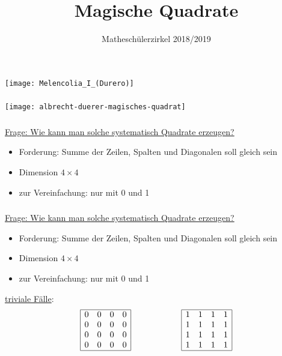 \documentclass[11pt]{beamer}
\begin{document}
	\author{Matheschülerzirkel 2018/2019}
	\title{Magische Quadrate}
\begin{frame}[plain]
	\begin{center}
		\texttt{[image: Melencolia\_I\_(Durero)]}
	\end{center}
\end{frame}

\begin{frame}
	\frametitle{}
	\begin{center}
		\texttt{[image: albrecht-duerer-magisches-quadrat]}
	\end{center}
\end{frame}

\begin{frame}
	\frametitle{}
		\underline{Frage: Wie kann man solche systematisch Quadrate erzeugen?}
	\begin{itemize}
		\item Forderung: Summe der Zeilen, Spalten und Diagonalen soll gleich sein
		\item Dimension $4\times4$
		\item zur Vereinfachung: nur mit 0 und 1 
	\end{itemize}
\end{frame}

\begin{frame}
\frametitle{}
\underline{Frage: Wie kann man solche systematisch Quadrate erzeugen?}
\begin{itemize}
	\item Forderung: Summe der Zeilen, Spalten und Diagonalen soll gleich sein
	\item Dimension $4\times4$
	\item zur Vereinfachung: nur mit 0 und 1 
\end{itemize}
\underline{triviale F\"alle}:\\
\[
\begin{array}{|cccc|}
\hline
0 & 0 & 0 & 0 \\ 
0 & 0 & 0 & 0 \\ 
0 & 0 & 0 & 0 \\ 
0 & 0 & 0 & 0 \\
\hline
\end{array} 
\qquad \qquad \qquad
\begin{array}{|cccc|}
\hline
1 & 1 & 1 & 1 \\ 
1 & 1 & 1 & 1 \\ 
1 & 1 & 1 & 1 \\ 
1 & 1 & 1 & 1 \\
\hline
\end{array} 
\]

\end{frame}
\end{document}
